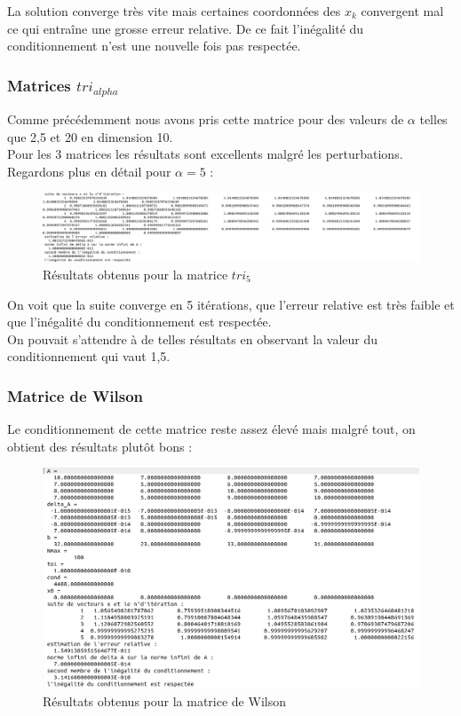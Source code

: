 \documentclass[12,french]{report}
\begin{document}
La solution converge très vite mais certaines coordonnées des $x_{k}$ convergent mal ce qui entraîne une grosse erreur relative. De ce fait l'inégalité du conditionnement n'est une nouvelle fois pas respectée.

\subsubsection{Matrices $tri_{alpha}$}

Comme précédemment nous avons pris cette matrice pour des valeurs de $\alpha$ telles que 2,5 et 20 en dimension 10.\\
Pour les 3 matrices les résultats sont excellents malgré les perturbations.\\
Regardons plus en détail pour $\alpha=5$ :

\begin{figure}[H]
	\centering
	\includegraphics[width=1\textwidth]{./Images/tri_5_1.res}
	\caption{Résultats obtenus pour la matrice $tri_{5}$}
\end{figure}

On voit que la suite converge en 5 itérations, que l'erreur relative est très faible et que l'inégalité du conditionnement est respectée.\\
On pouvait s'attendre à de telles résultats en observant la valeur du conditionnement qui vaut 1,5.

\subsubsection{Matrice de Wilson}

Le conditionnement de cette matrice reste assez élevé mais malgré tout, on obtient des résultats plutôt bons :\\

\begin{figure}[H]
	\centering
	\includegraphics[width=1\textwidth]{./Images/W_1.res}
	\caption{Résultats obtenus pour la matrice de Wilson}
\end{figure}
\end{document}
